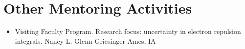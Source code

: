 \section{Other Mentoring Activities}
\vspace{5pt}
\begin{itemize}
	\item{
		{Visiting Faculty Program. Research focus: uncertainty in electron repulsion integrals.}
		{Nancy L. Glenn Griesinger}
		{Ames, IA}
		{}
		{}}
\end{itemize}